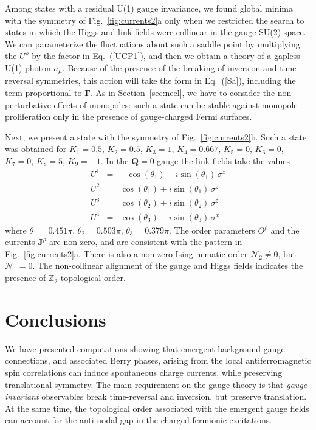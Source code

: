 \documentclass[aps,prb,preprint,onecolumn,citeautoscript,superscriptaddress,footinbib,
eqsecnum]{revtex4-1}
\def\bea{\begin{eqnarray}}
\def\eea{\end{eqnarray}}
\newcommand{\nn}{\nonumber \\}
\begin{document}
Among states with a residual U(1) gauge invariance, we found global minima with the symmetry of Fig.~\ref{fig:currents2}a only when
we restricted the search to states in which the Higgs and link fields were collinear in the gauge SU(2) space. We can parameterize the fluctuations about such a saddle point by multiplying the $U^\rho$
by the factor in Eq.~(\ref{UCP1}), and then we obtain a theory of a gapless U(1) photon $a_\mu$.
Because of the presence of the breaking of inversion and time-reversal symmetries, this action
will take the form in Eq.~(\ref{Sa}), including the term proportional to ${\bm \Gamma}$. As in
Section~\ref{sec:neel}, we have to consider the non-perturbative effects of monopoles: 
such a state can be stable against monopole proliferation only in the presence
of gauge-charged Fermi surfaces.

Next, we present a state with the symmetry of Fig.~\ref{fig:currents2}b.
Such a state was obtained for $K_1=0.5$, $K_2 = 0.5$, $K_3 = 1$, $K_4 = 0.667$, $K_5 =0$, $K_6 =0$, $K_7 = 0$,
$K_8=5$, $K_9=-1$. In the ${\bm Q}=0$ gauge the link fields take the values
\bea
U^1 &=& -\cos (\theta_1) - i \sin (\theta_1) \, \sigma^z  \nn
U^2 &=& \cos (\theta_1) + i \sin (\theta_1) \, \sigma^z \nn 
U^3 &=& \cos (\theta_2) + i \sin (\theta_2) \, \sigma^z \nn 
U^4 &=& \cos (\theta_3) - i \sin (\theta_3) \, \sigma^x 
\eea
where $\theta_1 = 0.451 \pi$, $\theta_2 = 0.503 \pi$, $\theta_3 = 0.379 \pi$. 
The order parameters $O^\rho$ and the currents ${\bm J}^\rho$ are
non-zero, and are consistent with the pattern in Fig.~\ref{fig:currents2}a.
There is also a non-zero Ising-nematic
order $\mathcal{N}_2 \neq 0$, but $\mathcal{N}_1 = 0$. The non-collinear alignment of the
gauge and Higgs fields indicates the presence of $\mathbb{Z}_2$ topological order.

\section{Conclusions}
\label{sec:conc}

We have presented 
computations showing that emergent background gauge connections, and associated Berry phases, arising from 
the local antiferromagnetic spin correlations
can induce spontaneous charge currents, while preserving translational symmetry. The main requirement on the gauge
theory is that {\it gauge-invariant} observables break time-reversal and inversion, but preserve
translation. 
At the same time, the topological order associated with the emergent gauge fields can account for the
anti-nodal gap in the charged fermionic excitations. 
\end{document}
